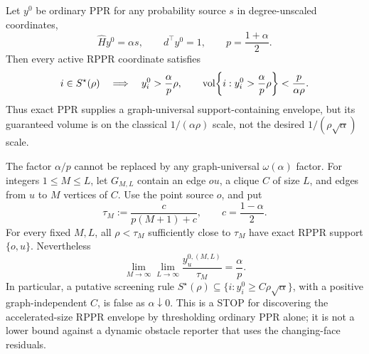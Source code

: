 \begin{proposition}
\label{prop:aesp-cd-point-source-ppr-screening}
Let \(y^0\) be ordinary PPR for any probability source $s$ in
degree-unscaled coordinates,
\begin{equation*}
 \widehat H y^0=\alpha s,
 \qquad d^\top y^0=1,
 \qquad p=\frac{1+\alpha}{2}.
\end{equation*}
Then every active RPPR coordinate satisfies
\begin{equation}
 i\in S^\star(\rho)
 \quad\Longrightarrow\quad
 y_i^0>\frac{\alpha}{p}\rho,
 \qquad
 \operatorname{vol}\!\left\{i:y_i^0>\frac{\alpha}{p}\rho\right\}
 <\frac{p}{\alpha\rho}.
 \label{eq:aesp-cd-point-source-ppr-screening}
\end{equation}
Thus exact PPR supplies a graph-universal support-containing envelope, but
its guaranteed volume is on the classical \(1/(\alpha\rho)\) scale, not the
desired \(1/(\rho\sqrt\alpha)\) scale.

The factor \(\alpha/p\) cannot be replaced by any graph-universal
\(\omega(\alpha)\) factor.  For integers \(1\leq M\leq L\), let
\(G_{M,L}\) contain an edge \(ou\), a clique \(C\) of size \(L\), and edges
from \(u\) to \(M\) vertices of \(C\).  Use the point source \(o\), and put
\begin{equation*}
 \tau_M:=\frac{c}{p(M+1)+c},
 \qquad c=\frac{1-\alpha}{2}.
\end{equation*}
For every fixed \(M,L\), all \(\rho<\tau_M\) sufficiently close to
\(\tau_M\) have exact RPPR support \(\{o,u\}\).  Nevertheless
\begin{equation}
 \lim_{M\to\infty}\lim_{L\to\infty}
 \frac{y_{u}^{0,(M,L)}}{\tau_M}
 =\frac{\alpha}{p}.
 \label{eq:aesp-cd-point-source-ppr-screening-sharp}
\end{equation}
In particular, a putative screening rule
\(S^\star(\rho)\subseteq\{i:y_i^0\geq C\rho\sqrt\alpha\}\), with a positive
graph-independent \(C\), is false as \(\alpha\downarrow0\).  This is a STOP
for discovering the accelerated-size RPPR envelope by thresholding ordinary
PPR alone; it is not a lower bound against a dynamic obstacle reporter that
uses the changing-face residuals.
\end{proposition}

